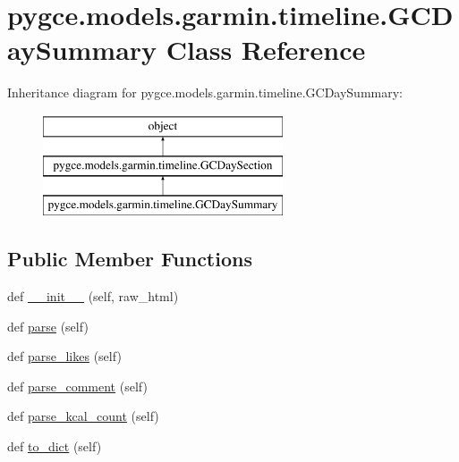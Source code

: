 \hypertarget{classpygce_1_1models_1_1garmin_1_1timeline_1_1_g_c_day_summary}{}\section{pygce.\+models.\+garmin.\+timeline.\+G\+C\+Day\+Summary Class Reference}
\label{classpygce_1_1models_1_1garmin_1_1timeline_1_1_g_c_day_summary}
Inheritance diagram for pygce.\+models.\+garmin.\+timeline.\+G\+C\+Day\+Summary\+:\begin{figure}[H]
\begin{center}
\leavevmode
\includegraphics[height=3.000000cm]{classpygce_1_1models_1_1garmin_1_1timeline_1_1_g_c_day_summary}
\end{center}
\end{figure}
\subsection*{Public Member Functions}
\begin{DoxyCompactItemize}
\item 
def \hyperlink{classpygce_1_1models_1_1garmin_1_1timeline_1_1_g_c_day_summary_a9af14ec017803981a9b6047877d92be7}{\+\_\+\+\_\+init\+\_\+\+\_\+} (self, raw\+\_\+html)
\item 
def \hyperlink{classpygce_1_1models_1_1garmin_1_1timeline_1_1_g_c_day_summary_ab7b302fdc532d60ac846230bc0a28150}{parse} (self)
\item 
def \hyperlink{classpygce_1_1models_1_1garmin_1_1timeline_1_1_g_c_day_summary_a6b4f9c47531f9a6ed2f82751153a6611}{parse\+\_\+likes} (self)
\item 
def \hyperlink{classpygce_1_1models_1_1garmin_1_1timeline_1_1_g_c_day_summary_adb9b8c1210354666d6a137d3e1cc50c4}{parse\+\_\+comment} (self)
\item 
def \hyperlink{classpygce_1_1models_1_1garmin_1_1timeline_1_1_g_c_day_summary_a96e573903735f0ed37698d79d43116f0}{parse\+\_\+kcal\+\_\+count} (self)
\item 
def \hyperlink{classpygce_1_1models_1_1garmin_1_1timeline_1_1_g_c_day_summary_a65d756c22031bee3eebcef9e1df1040b}{to\+\_\+dict} (self)
\end{DoxyCompactItemize}

